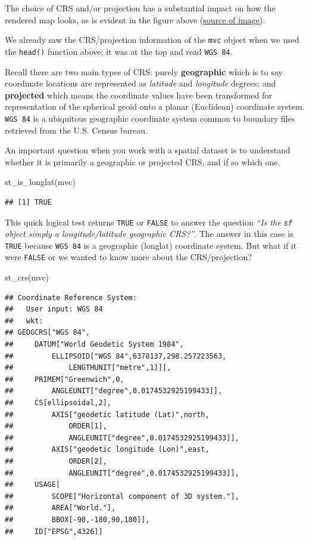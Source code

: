 \documentclass[
]{book}
\newenvironment{Shaded}{\begin{snugshade}}{\end{snugshade}}
\newcommand{\FunctionTok}[1]{\textcolor[rgb]{0.00,0.00,0.00}{#1}}
\newcommand{\NormalTok}[1]{#1}
\begin{document}
The choice of CRS and/or projection has a substantial impact on how the rendered map looks, as is evident in the figure above (\href{https://datacarpentry.org/organization-geospatial/03-crs/}{source of image}).

We already saw the CRS/projection information of the \texttt{mvc} object when we used the \texttt{head()} function above; it was at the top and read \texttt{WGS\ 84}.

Recall there are two main types of CRS: purely \textbf{geographic} which is to say coordinate locations are represented as \emph{latitude} and \emph{longitude} degrees; and \textbf{projected} which means the coordinate values have been transformed for representation of the spherical geoid onto a planar (Euclidean) coordinate system. \texttt{WGS\ 84} is a ubiquitous geographic coordinate system common to boundary files retrieved from the U.S. Census bureau.

An important question when you work with a spatial dataset is to understand whether it is primarily a geographic or projected CRS, and if so which one.

\begin{Shaded}
\begin{Highlighting}[]
\FunctionTok{st\_is\_longlat}\NormalTok{(mvc)}
\end{Highlighting}
\end{Shaded}

\begin{verbatim}
## [1] TRUE
\end{verbatim}

This quick logical test returns \texttt{TRUE} or \texttt{FALSE} to answer the question \emph{``Is the \texttt{sf} object simply a longitude/latitude geographic CRS?''}. The answer in this case is \texttt{TRUE} because \texttt{WGS\ 84} is a geographic (longlat) coordinate system. But what if it were \texttt{FALSE} or we wanted to know more about the CRS/projection?

\begin{Shaded}
\begin{Highlighting}[]
\FunctionTok{st\_crs}\NormalTok{(mvc)}
\end{Highlighting}
\end{Shaded}

\begin{verbatim}
## Coordinate Reference System:
##   User input: WGS 84 
##   wkt:
## GEOGCRS["WGS 84",
##     DATUM["World Geodetic System 1984",
##         ELLIPSOID["WGS 84",6378137,298.257223563,
##             LENGTHUNIT["metre",1]]],
##     PRIMEM["Greenwich",0,
##         ANGLEUNIT["degree",0.0174532925199433]],
##     CS[ellipsoidal,2],
##         AXIS["geodetic latitude (Lat)",north,
##             ORDER[1],
##             ANGLEUNIT["degree",0.0174532925199433]],
##         AXIS["geodetic longitude (Lon)",east,
##             ORDER[2],
##             ANGLEUNIT["degree",0.0174532925199433]],
##     USAGE[
##         SCOPE["Horizontal component of 3D system."],
##         AREA["World."],
##         BBOX[-90,-180,90,180]],
##     ID["EPSG",4326]]
\end{verbatim}
\end{document}
